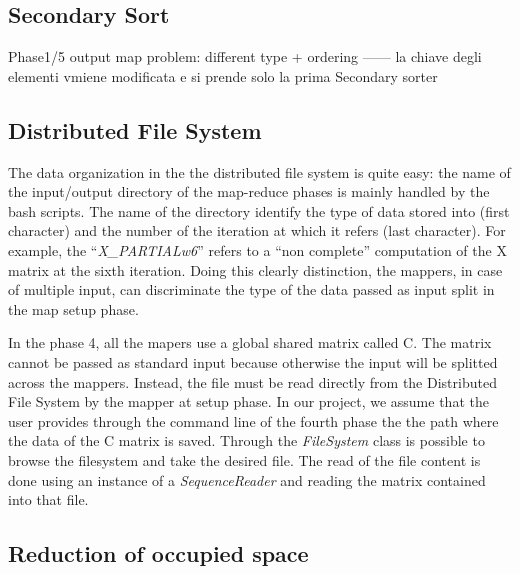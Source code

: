 \documentclass[a4paper,12pt]{article}
\newcommand{\CLASS}[1] {\textit{#1}}
\begin{document}
\subsection{Secondary Sort}


Phase1/5 output map problem: different type + ordering ------ la chiave degli elementi vmiene modificata e si prende solo la prima
Secondary sorter

\subsection{Distributed File System}

The data organization in the the distributed file system is quite easy: the name of the input/output directory of the map-reduce phases is mainly handled by the bash scripts. The name of the directory identify the type of data stored into (first character)  and the number of the iteration at which it refers (last character). For example, the ``\textit{X\_PARTIALw6}'' refers to a ``non complete'' computation of the X matrix at the sixth iteration. Doing this clearly distinction, the mappers, in case of multiple input, can discriminate the type of the data passed as input split in the map setup phase.

In the phase 4, all the mapers use a global shared matrix called C. The matrix cannot be passed as standard input because otherwise the input will be splitted across the mappers. Instead, the file must be read directly from the Distributed File System by the mapper at setup phase. In our project, we assume that the user provides through the command line of the fourth phase the the path where the data of the C matrix is saved. Through the \CLASS{FileSystem} class is possible to browse the filesystem and take the desired file. The read of the file content is done using an instance of a \CLASS{SequenceReader} and reading the matrix contained into that file.


\subsection{Reduction of occupied space}
\end{document}
